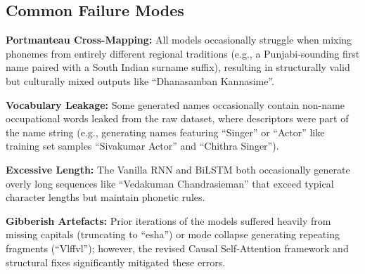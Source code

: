 \documentclass[11pt,a4paper]{article}
\begin{document}
\subsection{Common Failure Modes}

\textbf{Portmanteau Cross-Mapping:} All models occasionally struggle when mixing phonemes from entirely different regional traditions (e.g., a Punjabi-sounding first name paired with a South Indian surname suffix), resulting in structurally valid but culturally mixed outputs like ``Dhanasamban Kannasime''.

\textbf{Vocabulary Leakage:} Some generated names occasionally contain non-name occupational words leaked from the raw dataset, where descriptors were part of the name string (e.g., generating names featuring ``Singer'' or ``Actor'' like training set samples ``Sivakumar Actor'' and ``Chithra Singer'').

\textbf{Excessive Length:} The Vanilla RNN and BiLSTM both occasionally generate overly long sequences like ``Vedakuman Chandrasieman'' that exceed typical character lengths but maintain phonetic rules.

\textbf{Gibberish Artefacts:} Prior iterations of the models suffered heavily from missing capitals (truncating to ``esha'') or mode collapse generating repeating fragments (``Vlffvl''); however, the revised Causal Self-Attention framework and structural fixes significantly mitigated these errors.
\end{document}
